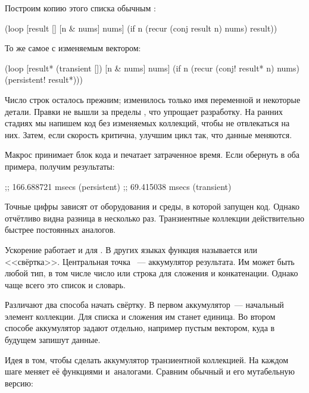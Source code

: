 
\noindent
Построим копию этого списка обычным :

\begin{clojure}
(loop [result []
       [n & nums] nums]
  (if n
    (recur (conj result n) nums)
    result))
\end{clojure}

\noindent
То же самое с изменяемым вектором:

\begin{clojure}
(loop [result* (transient [])
       [n & nums] nums]
  (if n
    (recur (conj! result* n) nums)
    (persistent! result*)))
\end{clojure}

Число строк осталось прежним; изменилось только имя переменной и некоторые
детали. Правки не вышли за пределы , что упрощает разработку. На
ранних стадиях мы напишем код без изменяемых коллекций, чтобы не отвлекаться на
них. Затем, если скорость критична, улучшим цикл так, что данные меняются.

Макрос  принимает блок кода и печатает затраченное время. Если
обернуть в  оба примера, получим результаты:

\begin{text}
;; 166.688721 msecs (persistent)
;;  69.415038 msecs (transient)
\end{text}

Точные цифры зависят от оборудования и среды, в которой запущен код. Однако
отчётливо видна разница в несколько раз. Транзиентные коллекции действительно
быстрее постоянных аналогов.


Ускорение работает и для . В других языках функция называется
 или <<свёртка>>. Центральная точка ~---
аккумулятор результата. Им может быть любой тип, в том числе число или строка
для сложения и конкатенации. Однако чаще всего это список и словарь.

Различают два способа начать свёртку. В первом аккумулятор~--- начальный элемент
коллекции. Для списка  и сложения им станет единица. Во втором
способе аккумулятор задают отдельно, например пустым вектором, куда в будущем
запишут данные.

Идея в том, чтобы сделать аккумулятор транзиентной коллекцией. На каждом шаге
 меняет её функциями  и~аналогами. Сравним
обычный  и его мутабельную версию:

